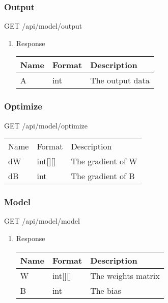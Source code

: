 \documentclass[11pt]{article}
\begin{document}
\subsubsection{Output}
\label{sec:orga08bd35}
GET /api/model/output
\begin{enumerate}
\item Response
\label{sec:orgdaca863}
\begin{center}
\begin{tabular}{lll}
Name & Format & Description\\
\hline
A & int & The output data\\
\end{tabular}
\end{center}
\end{enumerate}
\subsubsection{Optimize}
\label{sec:org5ba6b08}
GET /api/model/optimize
\begin{center}
\begin{tabular}{lll}
Name & Format & Description\\
dW & int[][] & The gradient of W\\
dB & int & The gradient of B\\
\end{tabular}
\end{center}
\subsubsection{Model}
\label{sec:org0380756}
GET /api/model/model
\begin{enumerate}
\item Response
\label{sec:org1103382}
\begin{center}
\begin{tabular}{lll}
Name & Format & Description\\
\hline
W & int[][] & The weights matrix\\
B & int & The bias\\
\end{tabular}
\end{center}
\end{enumerate}
\end{document}
